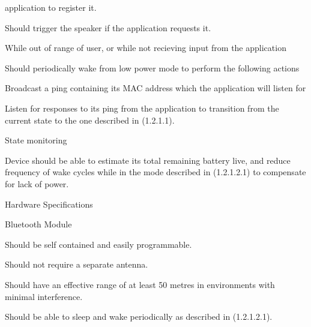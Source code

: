 \documentclass[12pt]{article}
\begin{document}
\begin{packed_enum}
\begin{packed_enum}
\begin{packed_enum}
\begin{packed_enum}
\begin{packed_enum}
                  application to register it.
            \item Should trigger the speaker if the application requests it.
          \end{packed_enum}
          \item While out of range of user, or while not recieving input from
                the application
          \begin{packed_enum}
            \item Should periodically wake from low power mode to perform the 
                  following actions
            \begin{packed_enum}
              \item Broadcast a ping containing its MAC address which the
                    application will listen for
              \item Listen for responses to its ping from the application to
                    transition from the current state to the one described in
                    (1.2.1.1).
            \end{packed_enum}
          \end{packed_enum}
        \end{packed_enum}
        \item State monitoring
        \begin{packed_enum}
          \item Device should be able to estimate its total remaining battery
                live, and reduce frequency of wake cycles while in the mode
                described in (1.2.1.2.1) to compensate for lack of power.
        \end{packed_enum}
      \end{packed_enum}
      \item Hardware Specifications
      \begin{packed_enum}
        \item Bluetooth Module
        \begin{packed_enum}
          \item Should be self contained and easily programmable.
          \item Should not require a separate antenna.
          \item Should have an effective range of at least 50 metres in 
                environments with minimal interference.
          \item Should be able to sleep and wake periodically as described in
                (1.2.1.2.1).

\end{packed_enum}
\end{packed_enum}
\end{packed_enum}
\end{packed_enum}
\end{document}
